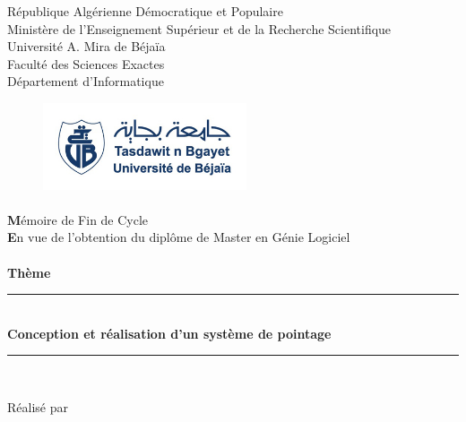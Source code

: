 
\begin{titlepage}

\begin{center}

  \large{République Algérienne Démocratique et Populaire}\\
  \large{Ministère de l'Enseignement Supérieur et de la Recherche Scientifique}\\
  \large{Université A. Mira de Béjaïa}\\
  \large{Faculté des Sciences Exactes}\\
  \large{Département d'Informatique}\\


	\begin{figure}[h!]
		\centering
		\includegraphics[width=6cm]{images/logo.jpg}
	\end{figure}
	
    \paragraph{}
     
		{\LARGE{\textbf Mémoire de Fin de Cycle}} \\[2ex]
    \textbf En vue de l'obtention du diplôme de Master en Génie Logiciel \\[1ex]
    \paragraph{}
		
    \textbf{Thème}\\[1ex]
		\rule{18cm}{1pt}
        {\Huge{\textbf{{\\
   Conception et réalisation d'un système de pointage \\}}}}
		\rule{18cm}{1pt}\\
	  \vspace{0.2cm}

\end{center}

\begin{center}

\large Réalisé par


\end{center}
\end{titlepage}
